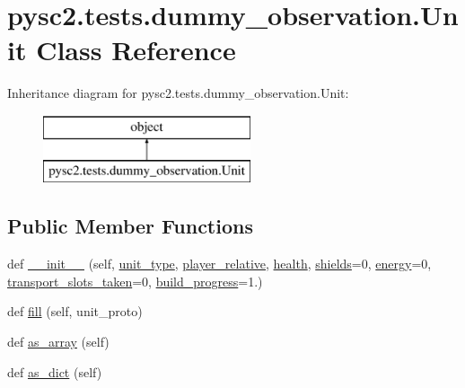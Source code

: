 \hypertarget{classpysc2_1_1tests_1_1dummy__observation_1_1_unit}{}\section{pysc2.\+tests.\+dummy\+\_\+observation.\+Unit Class Reference}
\label{classpysc2_1_1tests_1_1dummy__observation_1_1_unit}
Inheritance diagram for pysc2.\+tests.\+dummy\+\_\+observation.\+Unit\+:\begin{figure}[H]
\begin{center}
\leavevmode
\includegraphics[height=2.000000cm]{classpysc2_1_1tests_1_1dummy__observation_1_1_unit}
\end{center}
\end{figure}
\subsection*{Public Member Functions}
\begin{DoxyCompactItemize}
\item 
def \mbox{\hyperlink{classpysc2_1_1tests_1_1dummy__observation_1_1_unit_a4c8b7eef0f74a60b154607800a4dfcf3}{\+\_\+\+\_\+init\+\_\+\+\_\+}} (self, \mbox{\hyperlink{classpysc2_1_1tests_1_1dummy__observation_1_1_unit_a2d3589a320d10ad3825139405cfdd41d}{unit\+\_\+type}}, \mbox{\hyperlink{classpysc2_1_1tests_1_1dummy__observation_1_1_unit_ad8d75d8c395e4d5cc57d7a4a22ddef0d}{player\+\_\+relative}}, \mbox{\hyperlink{classpysc2_1_1tests_1_1dummy__observation_1_1_unit_ac7b740091edb61f73123d2b4c9a4fa0e}{health}}, \mbox{\hyperlink{classpysc2_1_1tests_1_1dummy__observation_1_1_unit_a398ccdb0016e39694ff69f1d119f988d}{shields}}=0, \mbox{\hyperlink{classpysc2_1_1tests_1_1dummy__observation_1_1_unit_ae9c47af4d3c5ed579ae55a344f3822a6}{energy}}=0, \mbox{\hyperlink{classpysc2_1_1tests_1_1dummy__observation_1_1_unit_a0af1ece1cc8dd67bd225d7661852de33}{transport\+\_\+slots\+\_\+taken}}=0, \mbox{\hyperlink{classpysc2_1_1tests_1_1dummy__observation_1_1_unit_aea9057527f8c666711f293e3f6a77bb9}{build\+\_\+progress}}=1.)
\item 
def \mbox{\hyperlink{classpysc2_1_1tests_1_1dummy__observation_1_1_unit_ab93c28fac293df1ec17ce06121297ac0}{fill}} (self, unit\+\_\+proto)
\item 
def \mbox{\hyperlink{classpysc2_1_1tests_1_1dummy__observation_1_1_unit_ae2fd3dc18600b2cb3805219dd547ff11}{as\+\_\+array}} (self)
\item 
def \mbox{\hyperlink{classpysc2_1_1tests_1_1dummy__observation_1_1_unit_a5759fe39fdd593be8950fe318c818838}{as\+\_\+dict}} (self)
\end{DoxyCompactItemize}
